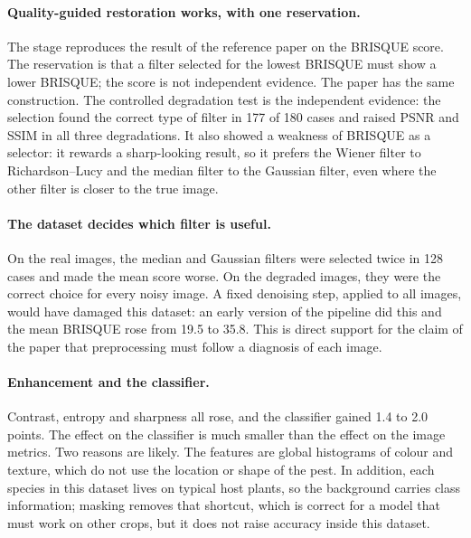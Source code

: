 \documentclass[12pt,a4paper]{article}
\begin{document}
\paragraph{Quality-guided restoration works, with one reservation.} The stage reproduces the result of the reference paper on the BRISQUE score. The reservation is that a filter selected for the lowest BRISQUE must show a lower BRISQUE; the score is not independent evidence. The paper has the same construction. The controlled degradation test is the independent evidence: the selection found the correct type of filter in 177 of 180 cases and raised PSNR and SSIM in all three degradations. It also showed a weakness of BRISQUE as a selector: it rewards a sharp-looking result, so it prefers the Wiener filter to Richardson--Lucy and the median filter to the Gaussian filter, even where the other filter is closer to the true image.

\paragraph{The dataset decides which filter is useful.} On the real images, the median and Gaussian filters were selected twice in 128 cases and made the mean score worse. On the degraded images, they were the correct choice for every noisy image. A fixed denoising step, applied to all images, would have damaged this dataset: an early version of the pipeline did this and the mean BRISQUE rose from 19.5 to 35.8. This is direct support for the claim of the paper that preprocessing must follow a diagnosis of each image.

\paragraph{Enhancement and the classifier.} Contrast, entropy and sharpness all rose, and the classifier gained 1.4 to 2.0 points. The effect on the classifier is much smaller than the effect on the image metrics. Two reasons are likely. The features are global histograms of colour and texture, which do not use the location or shape of the pest. In addition, each species in this dataset lives on typical host plants, so the background carries class information; masking removes that shortcut, which is correct for a model that must work on other crops, but it does not raise accuracy inside this dataset.
\end{document}
